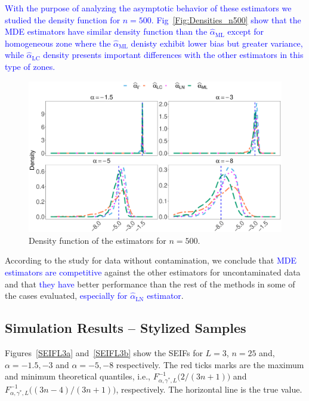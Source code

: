 \documentclass[twocolumn]{svjour3}
\begin{document}
\textcolor{blue}{
	With the purpose of analyzing the asymptotic behavior of these estimators we studied the density function for $n=500$. Fig~\ref{Fig:Densities_n500} show that the MDE estimators have similar density function than the $\widehat{\alpha}_{\text{{ML}}}$ except for homogeneous zone where the $\widehat{\alpha}_{\text{{ML}}}$ denisty exhibit lower bias but greater variance, while $\widehat{\alpha}_{\text{{LC}}}$ density presents important differences with the other estimators in this type of zones. 
}

\begin{figure}[hbt]
	\centering
	\includegraphics[width=1\linewidth]{../../../Figures/PaperTesis/Asymptotic_n500_TodoAlfa.eps}
	\caption{\label{Fig:Densities_n500} Density function of the estimators for $n=500$. }\label{Fig:DistEstimator}
\end{figure}

	According to the study for data without contamination, we conclude that \textcolor{blue}{MDE estimators are competitive} against the other estimators for uncontaminated data and that \textcolor{blue}{they have} better performance than the rest of the methods in some of the cases evaluated, \textcolor{blue}{especially for $\widehat{\alpha}_{\text{{LN}}}$ estimator}.
	
	\subsection{Simulation Results -- Stylized Samples}
	\label{StylizedSamples}
	
	Figures~\ref{SEIFL3a} and~\ref{SEIFL3b} show the SEIFs for $L=3$, $n=25$ and, $\alpha=-1.5,-3$ and $\alpha=-5,-8$ respectively. 
	The red ticks marks are the maximum and minimum theoretical quantiles, i.e., $F^{-1}_{\alpha,\gamma^*,L}\big(2/(3n+1)\big)$ and $F^{-1}_{\alpha,\gamma^*,L}\big((3n-4)/(3n+1)\big)$, respectively.
	The horizontal line is the true value.
	
\end{document}
